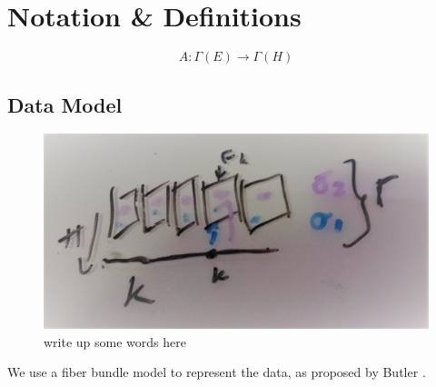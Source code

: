 \documentclass[../main.tex]{subfiles}
\begin{document}
\section{Notation \& Definitions}

\begin{equation}
    A: \Gamma(E) \rightarrow \Gamma(H)
\end{equation}


\subsection{Data Model}
\begin{figure}[ht]
    \label{fig:fiberbundle}
    \includegraphics{figures/sections/math/fiberbundle.png}
    \caption{write up some words here}
\end{figure}

We use a fiber bundle model to represent the data, as proposed by Butler 
\cite{butlerVectorBundleClassesForm1992,butlerVisualizationModelBased1989}. 
\end{document}
